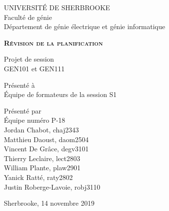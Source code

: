 \begin{titlepage}
    \centering
    UNIVERSITÉ DE SHERBROOKE\\
    Faculté de génie\\
    Département de génie électrique et génie informatique

    \vfill

    {\LARGE \bfseries \scshape Révision de la planification}

    \vfill

    Projet de session\\
    GEN101 et GEN111

    \vfill
    
    Présenté à\\
    Équipe de formateurs de la session S1

    \vfill

    Présenté par\\
    Équipe numéro P-18\\
    Jordan Chabot, chaj2343\\
    Matthieu Daoust, daom2504\\
    Vincent De Grâce, degv3101\\
    Thierry Leclaire, lect2803\\
    William Plante, plaw2901\\
    Yanick Ratté, raty2802\\
    Justin Roberge-Lavoie, robj3110

    \vfill

    Sherbrooke, 14 novembre 2019
\end{titlepage}
